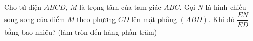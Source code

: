 \begin{ex}
Cho tứ diện $ABCD$, $M$ là trọng tâm của tam giác $ABC$. Gọi $N$ là hình chiếu song song của điểm $M$ theo phương $CD$ lên mặt phẳng $(ABD)$. Khi đó $\dfrac{EN}{ED}$ bằng bao nhiêu? (làm tròn đến hàng phần trăm)
\end{ex}
